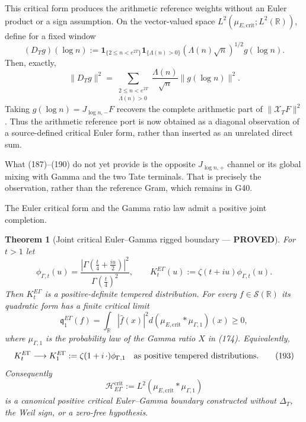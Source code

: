 \documentclass[11pt]{article}
\newtheorem{theorem}{Theorem}
\newcommand{\PROVED}{\textcolor{green!45!black}{\textbf{PROVED}}}
\begin{document}
This critical form produces the arithmetic reference weights without an
Euler product or a sign assumption.  On the vector-valued space
$L^2(\mu_{E,\mathrm{crit}};L^2(\mathbb R))$, define for a fixed window
\begin{equation}
 (D_Tg)(\log n):=
 \mathbf1_{\{2\le n<e^{2T}\}}\mathbf1_{\{\Lambda(n)>0\}}
 (\Lambda(n)\sqrt n)^{1/2}g(\log n).                 \tag{190}
\end{equation}
Then, exactly,
\[
 \|D_Tg\|^2
 =\sum_{\substack{2\le n<e^{2T}\\\Lambda(n)>0}}
   \frac{\Lambda(n)}{\sqrt n}\|g(\log n)\|^2.
\]
Taking $g(\log n)=J_{\log n,-}F$ recovers the complete arithmetic part of
$\|\mathcal X_TF\|^2$.  Thus the arithmetic reference port is now obtained
as a diagonal observation of a source-defined critical Euler form, rather
than inserted as an unrelated direct sum.

What (187)--(190) do not yet provide is the opposite $J_{\log n,+}$ channel
or its global mixing with Gamma and the two Tate terminals.  That is precisely
the observation, rather than the reference Gram, which remains in G40.

The Euler critical form and the Gamma ratio law admit a positive joint
completion.

\begin{theorem}[Joint critical Euler--Gamma rigged boundary --- \PROVED]
For $t>1$ let
\begin{equation}
 \phi_{\Gamma,t}(u)=
 \frac{|\Gamma(\frac t4+\frac{iu}{2})|^2}
      {\Gamma(\frac t4)^2},
 \qquad
 K_t^{E\Gamma}(u):=\zeta(t+iu)\phi_{\Gamma,t}(u).     \tag{191}
\end{equation}
Then $K_t^{E\Gamma}$ is a positive-definite tempered distribution.  For
every $f\in\mathcal S(\mathbb R)$ its quadratic form has a finite critical
limit
\begin{equation}
 \mathfrak q_1^{E\Gamma}(f)
 =\int_{\mathbb R}|\widehat f(x)|^2
       d(\mu_{E,\mathrm{crit}}*\mu_{\Gamma,1})(x)\ge0, \tag{192}
\end{equation}
where $\mu_{\Gamma,1}$ is the probability law of the Gamma ratio $X$ in
(174).  Equivalently,
\begin{equation}
 K_t^{E\Gamma}\longrightarrow
 K_1^{E\Gamma}:=\zeta(1+i\,\cdot)\phi_{\Gamma,1}
 \quad\hbox{as positive tempered distributions}.     \tag{193}
\end{equation}
Consequently
\begin{equation}
 \mathscr H_{E\Gamma}^{\mathrm{crit}}
 :=L^2(\mu_{E,\mathrm{crit}}*\mu_{\Gamma,1})          \tag{194}
\end{equation}
is a canonical positive critical Euler--Gamma boundary constructed without
$\Delta_T$, the Weil sign, or a zero-free hypothesis.
\end{theorem}
\end{document}
